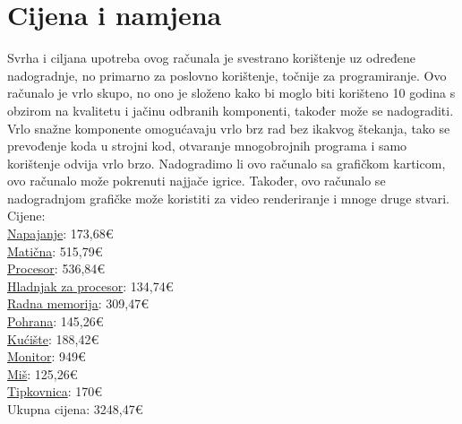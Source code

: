 \documentclass{report}
\begin{document}
\chapter{Cijena i namjena}
Svrha i ciljana upotreba ovog računala je svestrano korištenje uz određene nadogradnje, no primarno za poslovno korištenje, točnije za programiranje. Ovo računalo je vrlo skupo, no ono je složeno kako bi moglo biti korišteno 10 godina s obzirom na kvalitetu i jačinu odbranih komponenti, također može se nadograditi. Vrlo snažne komponente omogućavaju vrlo brz rad bez ikakvog štekanja, tako se prevođenje koda  u strojni kod, otvaranje mnogobrojnih programa i samo korištenje odvija vrlo brzo. Nadogradimo li ovo računalo sa grafičkom karticom, ovo računalo može pokrenuti najjače igrice. Također, ovo računalo se nadogradnjom grafičke može koristiti za video renderiranje i mnoge druge stvari.
\\Cijene: 
\\ \href{https://www.adm.hr/napajanje-seasonic-850w-focus-gx-850-full-modular-80-plus-gold-atx-/79129/product/?utm_source=nabava.net&utm_campaign=nabava.net&utm_medium=click}{Napajanje}: 173,68€ 
\\ \href{https://www.adm.hr/asus-z790-rog-strix-z790-a-gaming-wifi-ii-ddr5-intel-s1700-90mb1fn/79373/product/}{Matična}: 515,79€
\\ \href{https://www.adm.hr/intel-core-i7-14700k-34ghz-lga1700-boxed-without-cooler-bx807151470/78722/product/}{Procesor}: 536,84€
\\ \href{https://www.adm.hr/noctua-nh-u12a-chromax-black/70965/product/}{Hladnjak za procesor}: 134,74€ 
\\ \href{https://www.adm.hr/ddr5-64gb-2x32-gskill-6000mhz-trident-z5-black-cl30-f5-6000j3040g32gx2-tz/75778/product/}{Radna memorija}: 309,47€ 
\\ \href{https://www.adm.hr/samsung-ssd-1tb-990-pro-m2-pcie-40-x4-mz-v9p1t0bw-600tbw/75929/product/}{Pohrana}: 145,26€ 
\\ \href{https://www.adm.hr/fractal-design-north-charcoal-black-tg-light-tint-fd-c-nor1c-02/76085/product/}{Kućište}: 188,42€
\\ \href{https://www.mikronis.hr/Proizvod/monitor-samsung-odyssey-crg9-lc49rg90sspxen-49-dual-qhd-va-ultrawide-zakrivljeni-120hz-4ms-2x-hdmi-dp-minidp-audio-2x-usb/40472}{Monitor}: 949€
\\ \href{https://www.adm.hr/logitech-mx-master-3s-graphite-910-006559/73919/product/}{Miš}: 125,26€
\\ \href{https://team-media.hr/proizvod/logitech-mx-keys-kabellose-tastatur-graph-business-version-uk-layout-920-010250/?utm_source=nabava.net&utm_campaign=nabava.net&utm_medium=click}{Tipkovnica}: 170€
\\Ukupna cijena: 3248,47€
\end{document}

